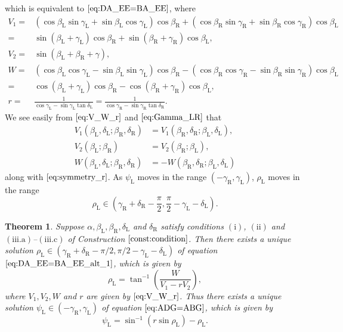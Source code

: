 \documentclass[11pt]{amsart}
\newtheorem{theorem}{Theorem}
\numberwithin{equation}{section}
\numberwithin{theorem}{section}
\newcommand{\Lt}{\ensuremath{\mathrm{L}}}
\newcommand{\Rt}{\ensuremath{\mathrm{R}}}
\begin{document}
which is equivalent to $\eqref{eq:DA_EE=BA_EE}$, where
\begin{equation}\label{eq:V_W_r}
\begin{aligned}
V_1=&(\cos\beta_\Lt\sin\gamma_\Lt +\sin\beta_\Lt\cos\gamma_\Lt )\cos\beta_\Rt +(\cos\beta_\Rt\sin\gamma_\Rt +\sin\beta_\Rt\cos\gamma_\Rt )\cos\beta_\Lt\\
=&\sin (\beta_\Lt +\gamma_\Lt )\cos\beta_\Rt +\sin (\beta_\Rt +\gamma_\Rt )\cos\beta_\Lt ,\\
V_2=&\sin(\beta_\Lt +\beta_\Rt +\gamma ),\\
W=&(\cos\beta_\Lt\cos\gamma_\Lt -\sin\beta_\Lt\sin\gamma_\Lt )\cos\beta_\Rt -(\cos\beta_\Rt\cos\gamma_\Rt -\sin\beta_\Rt\sin\gamma_\Rt )\cos\beta_\Lt \\
=&\cos (\beta_\Lt +\gamma_\Lt )\cos\beta_\Rt -\cos (\beta_\Rt +\gamma_\Rt )\cos\beta_\Lt ,\\
r=&\frac{1}{\cos\gamma_\Lt -\sin\gamma_\Lt\tan\delta_\Lt}=\frac{1}{\cos\gamma_\Rt -\sin\gamma_\Rt\tan\delta_\Rt}.
\end{aligned}
\end{equation}
We see easily from $\eqref{eq:V_W_r}$ and $\eqref{eq:Gamma_LR}$ that
\begin{equation}\label{eq:symmetry_VW}
\begin{aligned}
V_1(\beta_\Lt ,\delta_\Lt ;\beta_\Rt ,\delta_\Rt )&=V_1(\beta_\Rt ,\delta_\Rt ;\beta_\Lt ,\delta_\Lt ),\\
V_2(\beta_\Lt ;\beta_\Rt )&=V_2(\beta_\Rt ;\beta_\Lt ),\\
W(\beta_\Lt ,\delta_\Lt ;\beta_\Rt ,\delta_\Rt )&=-W(\beta_\Rt ,\delta_\Rt ;\beta_\Lt ,\delta_\Lt )
\end{aligned}
\end{equation}
along with $\eqref{eq:symmetry_r}$.
As $\psi_\Lt$ moves in the range $(-\gamma_\Rt ,\gamma_\Lt )$, $\rho_\Lt$ moves in the range
\begin{equation*}
\rho_\Lt\in\left(\gamma_\Rt +\delta_\Rt -\frac{\pi}{2}, \frac{\pi}{2}-\gamma_\Lt -\delta_\Lt \right) .
\end{equation*}

\begin{theorem}\label{thm:existence_rho}
Suppose $\alpha ,\beta_\Lt ,\beta_\Rt ,\delta_\Lt$ and $\delta_\Rt$ satisfy
conditions $(\mathrm{i})$, $(\mathrm{ii})$ and $(\mathrm{iii.a})$--$(\mathrm{iii.c})$ of Construction $\ref{const:condition}$.
Then there exists a unique solution $\rho_\Lt\in (\gamma_\Rt +\delta_\Rt -\pi /2, \pi /2-\gamma_\Lt -\delta_\Lt )$
of equation $\eqref{eq:DA_EE=BA_EE_alt_1}$, which is given by
\begin{equation*}
\rho_\Lt =\tan^{-1}\left(\frac{W}{V_1-rV_2}\right) ,
\end{equation*}
where $V_1,V_2,W$ and $r$ are given by $\eqref{eq:V_W_r}$.
Thus there exists a unique solution $\psi_\Lt\in (-\gamma_\Rt ,\gamma_\Lt )$ of equation $\eqref{eq:ADG=ABG}$, which is given by
\begin{equation*}
\psi_\Lt =\sin^{-1}(r\sin\rho_\Lt )-\rho_\Lt .
\end{equation*}
\end{theorem}
\end{document}
